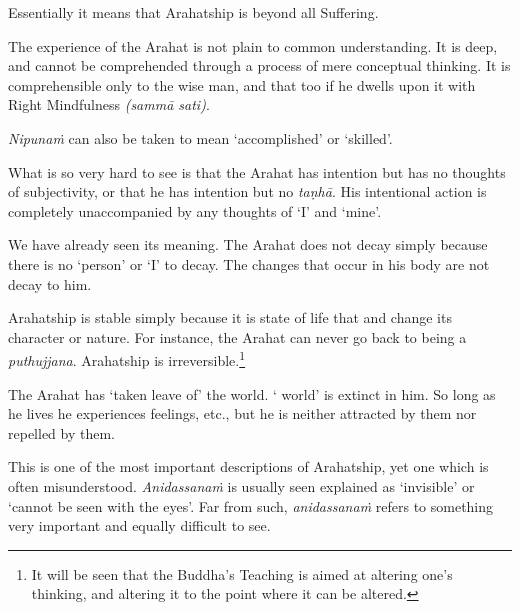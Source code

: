 
\protect\hypertarget{beyond}{}{}Essentially it means that Arahatship is beyond all Suffering.


The experience of the Arahat is not plain to common understanding. It is deep, and cannot be comprehended through a process of mere conceptual thinking. It is comprehensible only to the wise man, and that too if he dwells upon it with Right Mindfulness \emph{(sammā sati)}.

\emph{Nipunaṁ} can also be taken to mean `accomplished' or `skilled'.


What is so very hard to see is that the Arahat has intention but has no thoughts of subjectivity, or that he has intention but no \emph{taṇhā}. His intentional action is completely unaccompanied by any thoughts of `I' and `mine'.


We have already seen its meaning. The Arahat does not decay simply because there is no `person' or `I' to decay. The changes that occur in his body are not decay to him.


Arahatship is  stable simply because it is  state of life that  and  change its character or nature. For instance, the Arahat can never go back to being a \emph{puthujjana}. Arahatship is irreversible.\footnote{It will be seen that the Buddha's Teaching is aimed at altering one's thinking, and altering it to the point where it can  be altered.}


The Arahat has `taken leave of' the world. ` world' is extinct in him. So long as he lives he experiences feelings, etc., but he is neither attracted by them nor repelled by them.


This is one of the most important descriptions of Arahatship, yet one which is often misunderstood. \emph{Anidassanaṁ} is usually seen explained as `invisible' or `cannot be seen with the eyes'. Far from such, \emph{anidassanaṁ} refers to something very important and equally difficult to see.

